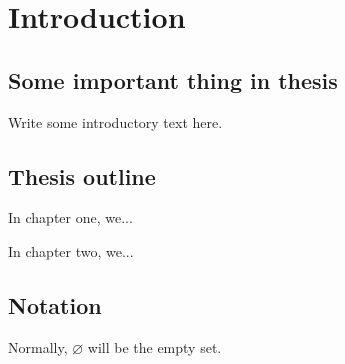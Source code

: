 \chapter*{Introduction}

\lipsum[1]

\section*{Some important thing in thesis}
Write some introductory text here. 
\lipsum[1-3]

\section*{Thesis outline}
In chapter one, we... 
\lipsum[1]

In chapter two, we...
\lipsum[1]

\section*{Notation}

Normally, $\varnothing$ will be the empty set. 
\lipsum[1]